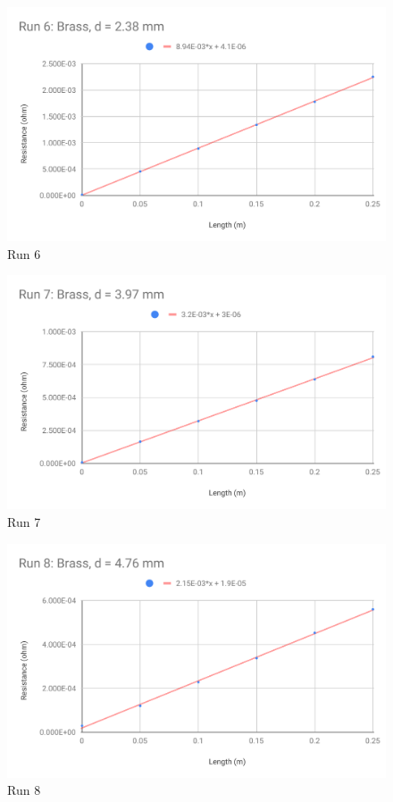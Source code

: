\begin{figure}[ht]
	\centering
	\includegraphics[scale=0.74]{image/02-resistance/run6.pdf}
	\caption{Run 6}
	\label{figure.02.run.6}
\end{figure}
\begin{figure}[ht]
	\centering
	\includegraphics[scale=0.74]{image/02-resistance/run7.pdf}
	\caption{Run 7}
	\label{figure.02.run.7}
\end{figure}
\begin{figure}[ht]
	\centering
	\includegraphics[scale=0.74]{image/02-resistance/run8.pdf}
	\caption{Run 8}
	\label{figure.02.run.8}
\end{figure}
